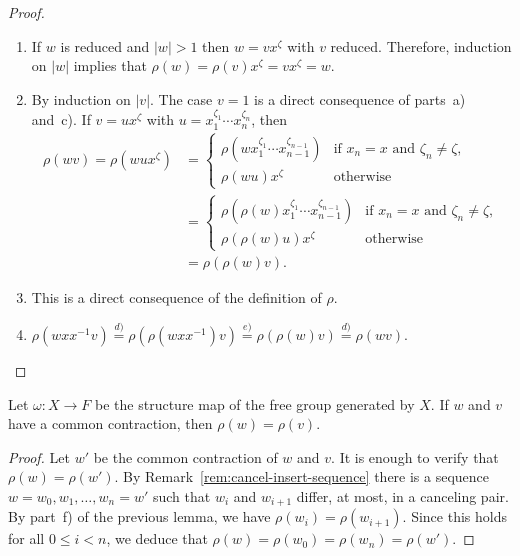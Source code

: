 \begin{proof}
\begin{enumerate}[\rm a)]
        \item If $w$ is reduced and $|w|>1$ then $w=vx^\zeta$ with $v$ reduced. Therefore, induction on $|w|$ implies that $\rho(w)=\rho(v)x^\zeta=vx^\zeta=w$.

        \item By induction on $|v|$. The case $v=1$ is a direct consequence of parts~a) and~c). If $v=ux^\zeta$ with $u=x_1^{\zeta_1}\cdots x_n^{\zeta_n}$, then
        \begin{align*}
            \rho(wv) = \rho(wux^{\zeta}) &= 
                \begin{cases}
                    \rho(wx_1^{\zeta_1}\cdots x_{n-1}^{\zeta_{n-1}})
                        &\text{if $x_n=x$ and $\zeta_n\ne\zeta$},\\
                    \rho(wu)x^{\zeta}
                        &\text{otherwise}
                \end{cases}\\
                &= 
                \begin{cases}
                    \rho(\rho(w)x_1^{\zeta_1}\cdots x_{n-1}^{\zeta_{n-1}})
                        &\text{if $x_n=x$ and $\zeta_n\ne\zeta$},\\
                    \rho(\rho(w)u)x^{\zeta}
                        &\text{otherwise}
                \end{cases}\\
                &= \rho(\rho(w)v).
        \end{align*}

        \item This is a direct consequence of the definition of $\rho$.

        \item $\rho(wxx^{-1}v) \stackrel{d)}{=} \rho(\rho(wxx^{-1})v)
            \stackrel{e)}{=} \rho(\rho(w)v) \stackrel{d)}{=} \rho(wv)$.
    \end{enumerate}
\end{proof}

\begin{prop}
    Let\/ $\omega\colon X\to F$ be the structure map of the free group generated by\/ $X$. If\/ $w$ and\/ $v$ have a common contraction, then\/ $\rho(w)=\rho(v)$.
\end{prop}

\begin{proof}
    Let $w'$ be the common contraction of $w$ and $v$. It is enough to verify that $\rho(w)=\rho(w')$. By Remark~\ref{rem:cancel-insert-sequence} there is a sequence $w=w_0, w_1,\dots,w_n=w'$ such that $w_i$ and $w_{i+1}$ differ, at most, in a canceling pair. By part~f) of the previous lemma, we have $\rho(w_i)=\rho(w_{i+1})$. Since this holds for all $0\le i<n$, we deduce that $\rho(w)=\rho(w_0)=\rho(w_n)=\rho(w')$.
\end{proof}

